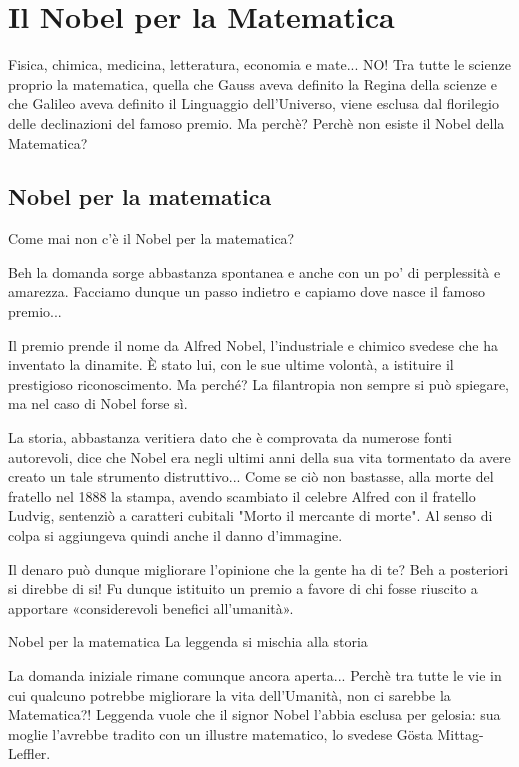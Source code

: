 \chapter{Il Nobel per la Matematica}
Fisica, chimica, medicina, letteratura, economia e mate... NO! Tra tutte le scienze proprio la matematica, quella che Gauss aveva definito la Regina della scienze e che Galileo aveva definito il Linguaggio dell'Universo, viene esclusa dal florilegio delle declinazioni del famoso premio. Ma perchè? Perchè non esiste il Nobel della Matematica?

\section{Nobel per la matematica}

Come mai non c’è il Nobel per la matematica?

Beh la domanda sorge abbastanza spontanea e anche con un po' di perplessità e amarezza. Facciamo dunque un passo indietro e capiamo dove nasce il famoso premio...

Il premio prende il nome da Alfred Nobel, l’industriale e chimico svedese che ha inventato la dinamite. È stato lui, con le sue ultime volontà, a istituire il prestigioso riconoscimento. Ma perché? La filantropia non sempre si può spiegare, ma nel caso di Nobel forse sì.

La storia, abbastanza veritiera dato che è comprovata da numerose fonti autorevoli, dice che Nobel era negli ultimi anni della sua vita tormentato da avere creato un tale strumento distruttivo... Come se ciò non bastasse, alla morte del fratello nel 1888 la stampa, avendo scambiato il celebre Alfred con il fratello Ludvig, sentenziò a caratteri cubitali "Morto il mercante di morte". Al senso di colpa si aggiungeva quindi anche il danno d’immagine.

Il denaro può dunque migliorare l'opinione che la gente ha di te? Beh a posteriori si direbbe di si! Fu dunque istituito un premio a favore di chi fosse riuscito a apportare «considerevoli benefici all’umanità».

Nobel per la matematica
La leggenda si mischia alla storia

La domanda iniziale rimane comunque ancora aperta... Perchè tra tutte le vie in cui qualcuno potrebbe migliorare la vita dell'Umanità, non ci sarebbe la Matematica?! Leggenda vuole che il signor Nobel l'abbia esclusa per gelosia: sua moglie l'avrebbe tradito con un illustre matematico, lo svedese Gösta Mittag-Leffler.

